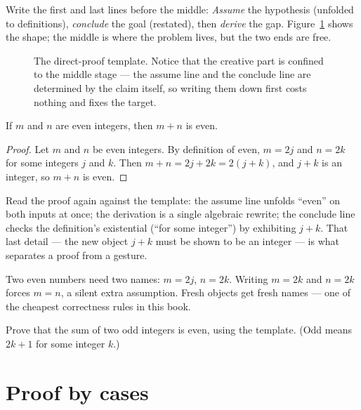 \begin{principle}
Write the first and last lines before the middle:
\emph{Assume} the hypothesis (unfolded to definitions), \emph{conclude} the goal
(restated), then \emph{derive} the gap. Figure~\ref{fig:prooftemplate} shows the
shape; the middle is where the problem lives, but the two ends are free.
\end{principle}

\begin{figure}[ht]\centering

\caption{The direct-proof template. Notice that the creative part is confined to
the middle stage --- the assume line and the conclude line are determined by the
claim itself, so writing them down first costs nothing and fixes the target.}
\label{fig:prooftemplate}
\end{figure}

\begin{theorem}\label{thm:evensum}
If $m$ and $n$ are even integers, then $m + n$ is even.
\end{theorem}

\begin{proof}
Let $m$ and $n$ be even integers. By definition of even, $m = 2j$ and $n = 2k$
for some integers $j$ and $k$. Then $m + n = 2j + 2k = 2(j + k)$, and $j + k$ is
an integer, so $m + n$ is even.
\end{proof}

Read the proof again against the template: the assume line unfolds ``even'' on
both inputs at once; the derivation is a single algebraic rewrite; the conclude
line checks the definition's existential (``for some integer'') by exhibiting
$j+k$. That last detail --- the new object $j+k$ must be shown to be an integer
--- is what separates a proof from a gesture.

\begin{remark}
Two even numbers need two names: $m = 2j$, $n = 2k$. Writing $m = 2k$ and
$n = 2k$ forces $m = n$, a silent extra assumption. Fresh objects get fresh
names --- one of the cheapest correctness rules in this book.
\end{remark}

\begin{exercise}[easy]\label{exr:oddsum}
Prove that the sum of two odd integers is even, using the template. (Odd means
$2k+1$ for some integer $k$.)
\end{exercise}

\section{Proof by cases}\label{sec:cases}

